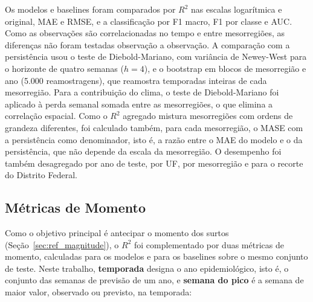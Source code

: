 Os modelos e baselines foram comparados por $R^2$ nas escalas logarítmica e original, MAE e RMSE, e a classificação por F1 macro, F1 por classe e AUC. Como as observações são correlacionadas no tempo e entre mesorregiões, as diferenças não foram testadas observação a observação. A comparação com a persistência usou o teste de Diebold-Mariano, com variância de Newey-West para o horizonte de quatro semanas ($h=4$), e o bootstrap em blocos de mesorregião e ano (5.000 reamostragens), que reamostra temporadas inteiras de cada mesorregião. Para a contribuição do clima, o teste de Diebold-Mariano foi aplicado à perda semanal somada entre as mesorregiões, o que elimina a correlação espacial. Como o $R^2$ agregado mistura mesorregiões com ordens de grandeza diferentes, foi calculado também, para cada mesorregião, o MASE com a persistência como denominador, isto é, a razão entre o MAE do modelo e o da persistência, que não depende da escala da mesorregião. O desempenho foi também desagregado por ano de teste, por UF, por mesorregião e para o recorte do Distrito Federal.

\subsection{Métricas de Momento}
\label{sec:met_momento}

Como o objetivo principal é antecipar o momento dos surtos (Seção~\ref{sec:ref_magnitude}), o $R^2$ foi complementado por duas métricas de momento, calculadas para os modelos e para os baselines sobre o mesmo conjunto de teste. Neste trabalho, \textbf{temporada} designa o ano epidemiológico, isto é, o conjunto das semanas de previsão de um ano, e \textbf{semana do pico} é a semana de maior valor, observado ou previsto, na temporada:

